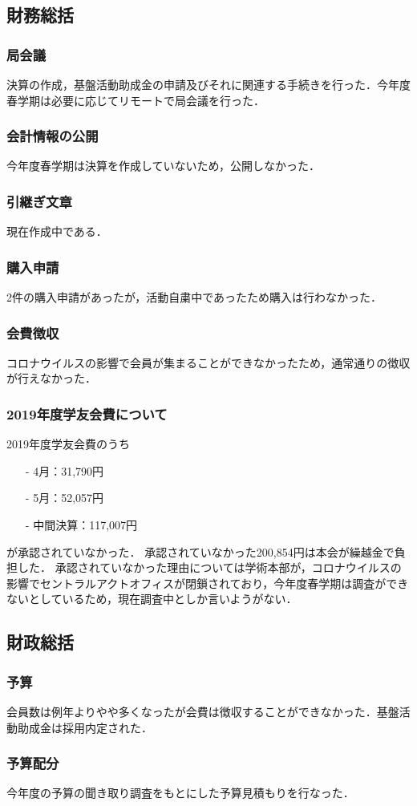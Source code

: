 \subsection*{財務総括}


\subsubsection*{局会議}
決算の作成，基盤活動助成金の申請及びそれに関連する手続きを行った．今年度春学期は必要に応じてリモートで局会議を行った．

\subsubsection*{会計情報の公開}
今年度春学期は決算を作成していないため，公開しなかった．

\subsubsection*{引継ぎ文章}
現在作成中である．

\subsubsection*{購入申請}
2件の購入申請があったが，活動自粛中であったため購入は行わなかった．

\subsubsection*{会費徴収}
コロナウイルスの影響で会員が集まることができなかったため，通常通りの徴収が行えなかった．

\subsubsection*{2019年度学友会費について}
2019年度学友会費のうち
\begin{itemize}
	\item[-]4月：31,790円
	\item[-]5月：52,057円
	\item[-]中間決算：117,007円
\end{itemize}
が承認されていなかった．
承認されていなかった200,854円は本会が繰越金で負担した．
承認されていなかった理由については学術本部が，コロナウイルスの影響でセントラルアクトオフィスが閉鎖されており，今年度春学期は調査ができないとしているため，現在調査中としか言いようがない．

\subsection*{財政総括}


\subsubsection*{予算}
会員数は例年よりやや多くなったが会費は徴収することができなかった．基盤活動助成金は採用内定された．

\subsubsection*{予算配分}
今年度の予算の聞き取り調査をもとにした予算見積もりを行なった．